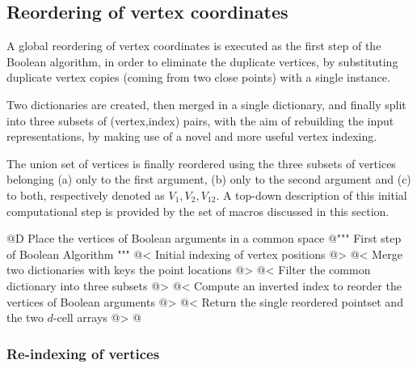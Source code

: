 \documentclass[11pt,oneside]{article}	%
\begin{document}
\subsection{Reordering of vertex coordinates}
A global reordering of vertex coordinates is executed as the first step of the Boolean algorithm, in order to eliminate the duplicate vertices, by substituting duplicate vertex copies (coming from two close points) with a single instance. 

Two dictionaries are created, then merged in a single dictionary, and finally split into three subsets of (vertex,index) pairs, with the aim of rebuilding the input representations, by making use of a novel and more useful vertex indexing.

The union set of vertices is finally reordered using the three subsets of vertices belonging (a) only to the first argument, (b) only to the second argument and (c) to both, respectively denoted as $V_1, V_2, V_{12}$. A top-down description of this initial computational step is provided by the set of macros discussed in this section.

@D Place the vertices of Boolean arguments in a common space
@{""" First step of Boolean Algorithm """
@< Initial indexing of vertex positions @>
@< Merge two dictionaries with keys the point locations @>
@< Filter the common dictionary into three subsets @>
@< Compute an inverted index to reorder the vertices of Boolean arguments @>
@< Return the single reordered pointset and the two $d$-cell arrays @>
@}

\subsubsection{Re-indexing of vertices}
\end{document}
